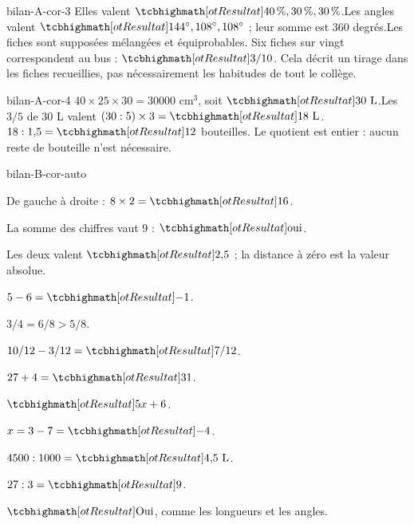 \begin{blocEdition}{bilan-A-cor-3}
Elles valent $\res{40\,\%,30\,\%,30\,\%}$.Les angles valent $\res{144^\circ,108^\circ,108^\circ}$ ; leur somme est 360 degrés.Les fiches sont supposées mélangées et équiprobables. Six fiches sur vingt correspondent au bus : $\res{3/10}$. Cela décrit un tirage dans les fiches recueillies, pas nécessairement les habitudes de tout le collège.\label{fig-bilan-A-cor-3}

\end{blocEdition}
\begin{blocEdition}{bilan-A-cor-4}
$40\times25\times30=30000$ cm$^3$, soit $\res{30\ \mathrm L}$.Les $3/5$ de 30 L valent $(30:5)\times3=\res{18\ \mathrm L}$.$18:1{,}5=\res{12}$ bouteilles. Le quotient est entier : aucun reste de bouteille n’est nécessaire.\label{fig-bilan-A-cor-4}

\end{blocEdition}
\begin{blocEdition}{bilan-B-cor-auto}
\begin{questions}
\item De gauche à droite : $8\times2=\res{16}$.
\item La somme des chiffres vaut 9 : $\res{\text{oui}}$.
\item Les deux valent $\res{2{,}5}$ ; la distance à zéro est la valeur absolue.
\item $5-6=\res{-1}$.
\item $3/4=6/8>5/8$.
\item $10/12-3/12=\res{7/12}$.
\item $27+4=\res{31}$.
\item $\res{5x+6}$.
\item $x=3-7=\res{-4}$.
\item $4500:1000=\res{4{,}5\ \mathrm L}$.
\item $27:3=\res9$.
\item $\res{\text{Oui}}$, comme les longueurs et les angles.\end{questions}
\end{blocEdition}
